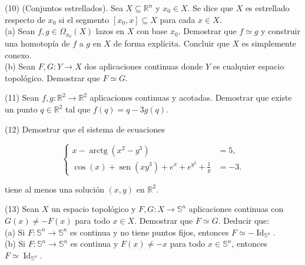 \documentclass[
  a4paper,
  spanish,
  12pt,
]{scrartcl}
\begin{document}
\begin{ejer}
(10) (Conjuntos estrellados). Sea $X \subseteq \mathbb{R}^{n}$ y $x_{0} \in X$. Se dice que $X$ es estrellado respecto de $x_{0}$ si el segmento $\left[x_{0}, x\right] \subseteq X$ para cada $x \in X$.\\
(a) Sean $f, g \in \Omega_{x_{0}}(X)$ lazos en $X$ con base $x_{0}$. Demostrar que $f \simeq g$ y construir una homotopía de $f$ a $g$ en $X$ de forma explícita. Concluir que $X$ es simplemente conexo.\\
(b) Sean $F, G: Y \rightarrow X$ dos aplicaciones continuas donde $Y$ es cualquier espacio topológico. Demostrar que $F \simeq G$.\\
\end{ejer}

\begin{ejer}
(11) Sean $f, g: \mathbb{R}^{2} \rightarrow \mathbb{R}^{2}$ aplicaciones continuas y acotadas. Demostrar que existe un punto $q \in \mathbb{R}^{2}$ tal que $f(q)=q-3 g(q)$.\\
\end{ejer}

\begin{ejer}
(12) Demostrar que el sistema de ecuaciones

$$
\left\{\begin{aligned}
x-\operatorname{arctg}\left(x^{2}-y^{3}\right) & =5, \\
\cos (x)+\operatorname{sen}\left(x y^{3}\right)+e^{x}+e^{y^{2}}+\frac{1}{y} & =-3 .
\end{aligned}\right.
$$

tiene al menos una solución $(x, y)$ en $\mathbb{R}^{2}$.\\
\end{ejer}

\begin{ejer}
(13) Sean $X$ un espacio topológico y $F, G: X \rightarrow \mathbb{S}^{n}$ aplicaciones continuas con $G(x) \neq-F(x)$ para todo $x \in X$. Demostrar que $F \simeq G$. Deducir que:\\
(a) Si $F: \mathbb{S}^{n} \rightarrow \mathbb{S}^{n}$ es continua y no tiene puntos fijos, entonces $F \simeq-\operatorname{Id}_{\mathbb{S}^{n}}$.\\
(b) Si $F: \mathbb{S}^{n} \rightarrow \mathbb{S}^{n}$ es continua y $F(x) \neq-x$ para todo $x \in \mathbb{S}^{n}$, entonces $F \simeq \operatorname{Id}_{\mathbb{S}^{n}}$.\\
\end{ejer}
\end{document}
